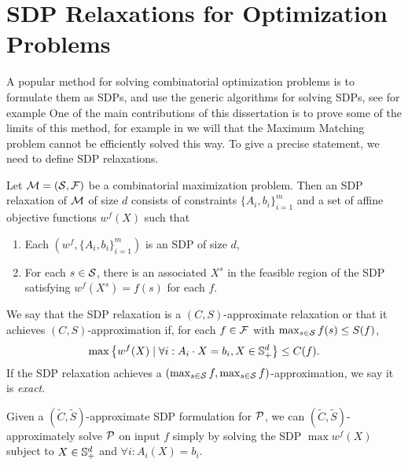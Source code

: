 \section{SDP Relaxations for Optimization Problems}\label{prelims_sdp_relaxations}
A popular method for solving combinatorial optimization problems is to formulate them as SDPs, and use the generic algorithms for solving SDPs, see for example \cite{}
One of the main contributions of this dissertation is to prove some of the limits of this method, for example in  we will
that the Maximum Matching problem cannot be efficiently solved this way. To give a precise statement, we need to define SDP relaxations.
\begin{definition}
Let $\mathcal M = (\mathcal S, \mathcal F)$ be a combinatorial maximization problem. Then an
  SDP relaxation of \(\mathcal M\)
  of size \(d\)
  consists of constraints $\{A_i, b_i\}_{i=1}^m$ and a set of affine objective functions $w^f(X)$ such that
	\begin{enumerate}
	\item Each $(w^f, \{A_i, b_i\}_{i=1}^m)$ is an SDP of size $d$,
	\item For each $s \in \mathcal S$, there is an associated $X^s$ in the feasible region of the SDP satisfying $w^f(X^s) = f(s)$ for each $f$.
	\end{enumerate}
	
	We say that the SDP relaxation is a $(C,S)$-approximate relaxation or that it achieves $(C,S)$-approximation if, for each
	$f \in \mathcal F$ with $\max_{s \in \mathcal S} f(s) \leq S(f)$, 
	\[\max \left\{ w^f(X) \mid \forall i: A_i \cdot X = b_i, X \in \mathbb{S}_+^d\right\} \leq C(f).\]
	If the SDP relaxation achieves a $(\max_{s\in \mathcal S} f, \max_{s\in \mathcal S} f)$-approximation, we say it is \emph{exact}.
\end{definition}
Given a $(\tilde{C}, \tilde{S})$-approximate SDP formulation for $\mathcal P$, we can $(\tilde{C}, \tilde{S})$-approximately solve $\mathcal P$ on input $f$ simply by solving
the SDP $\max w^f(X)$ subject to $X \in \mathbb{S}^{d}_+$ and $\forall i: A_i(X) = b_i$.

